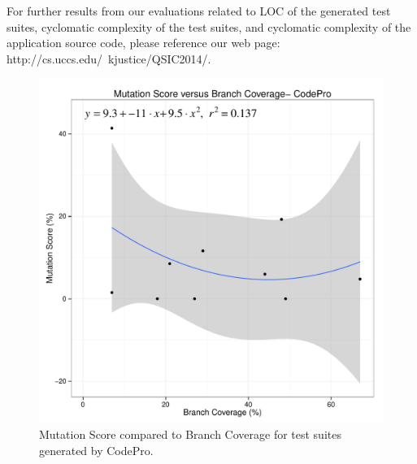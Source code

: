 For further results from our evaluations related to LOC of the generated test suites, cyclomatic complexity of the test suites, and cyclomatic complexity of the application source code, please reference our web page: http://cs.uccs.edu/~kjustice/QSIC2014/. 


\begin{figure}[!t]
\centering
  \includegraphics[width=\linewidth]{RGraphs/CodePro_BranchCov_versus_Mutation_poly.pdf}
    \caption{Mutation Score compared to Branch Coverage for test suites generated by CodePro.}
  \label{fig:CP_branch_mutation}
\end{figure}
